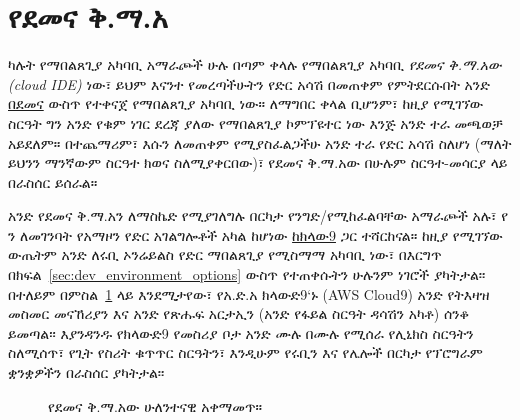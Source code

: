

\section{የደመና ቅ.ማ.አ}
\label{sec:cloud_ide}

ካሉት የማበልጸጊያ አካባቢ አማራጮች ሁሉ በጣም ቀላሉ የማበልጸጊያ አካባቢ \emph{የደመና ቅ.ማ.አው (cloud IDE)} ነው፣ ይህም እናንተ የመረጣችሁትን የድር አሳሽ በመጠቀም የምትደርሱበት አንድ \href{https://en.wikipedia.org/wiki/Cloud_computing}{በደመና} ውስጥ የተቀናጀ የማበልጸጊያ አካባቢ ነው። ለማግበር ቀላል ቢሆንም፣ ከዚያ የሚገኘው ስርዓት ግን አንድ የቁም ነገር ደረጃ ያለው የማበልጸጊያ ኮምፕዩተር ነው እንጅ አንድ ተራ መጫወቻ አይደለም። በተጨማሪም፣ እሱን ለመጠቀም የሚያስፈልጋችሁ አንድ ተራ የድር አሳሽ ስለሆነ (ማለት ይህንን ማንኛውም ስርዓተ ክወና ስለሚያቀርበው)፣ የደመና ቅ.ማ.አው በሁሉም ስርዓተ-መሳርያ ላይ በራስሰር ይሰራል።

አንድ የደመና ቅ.ማ.አን ለማስኬድ የሚያገለግሉ በርካታ የንግድ/የሚከፈልባቸው አማራጮች አሉ፣ የ \rort\/ን ለመገንባት የአማዞን የድር አገልግሎቶች አካል ከሆነው \href{http://c9.io/}{ከክላው9}  ጋር ተሻርከናል። ከዚያ የሚገኘው ውጤትም አንድ ለሩቢ ኦንሬይልስ የድር ማበልጸጊያ የሚስማማ አካባቢ ነው፣ በእርግጥ በክፍል~\ref{sec:dev_environment_options} ውስጥ የተጠቀሱትን ሁሉንም ነገሮች ያካትታል፡፡ በተለይም በምስል~\ref{fig:ide_anatomy} ላይ እንደሚታየው፣ የአ.ድ.አ ክላውድ9`ኑ (AWS Cloud9) አንድ የትእዛዝ መስመር መናኸሪያን እና አንድ የጽሑፍ አርታኢን (አንድ የፋይል ስርዓት ዳሳሽን አካቶ) ሰንቆ ይመጣል፡፡ እያንዳንዱ የክላውድ9 የመስሪያ ቦታ አንድ ሙሉ በሙሉ የሚሰራ የሊኒክስ ስርዓትን ስለሚሰጥ፣ የጊት የስሪት ቁጥጥር ስርዓትን፣ እንዲሁም የሩቢን እና የሌሎች በርካታ የፕሮግራም ቋንቋዎችን በራስሰር ያካትታል፡፡

\begin{figure}
\begin{center}
\end{center}
\caption{የደመና ቅ.ማ.አው ሁለንተናዊ አቀማመጥ።\label{fig:ide_anatomy}}
\end{figure}

